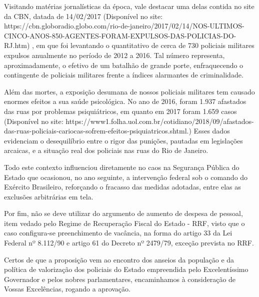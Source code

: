 \documentclass[10pt]{article}
\begin{document}
Visitando matérias jornalísticas da época, vale destacar uma delas contida no site da CBN, datada de 14/02/2017 (Disponível no site: https://cbn.globoradio.globo.com/rio-de-janeiro/2017/02/14/NOS-ULTIMOS-CINCO-ANOS-850-AGENTES-FORAM-EXPULSOS-DAS-POLICIAS-DO-RJ.htm) , em que foi levantando o quantitativo de cerca de 730 policiais militares expulsos anualmente no período de 2012 a 2016. Tal número representa, aproximadamente, o efetivo de um batalhão de grande porte, enfraquecendo o contingente de policiais militares frente a índices alarmantes de criminalidade.

Além das mortes, a exposição desumana de nossos policiais militares tem causado enormes efeitos a sua saúde psicológica. No ano de 2016, foram 1.937 afastados das ruas por problemas psiquiátricos, em quanto em 2017 foram 1.659 casos (Disponível no site: https://www1.folha.uol.com.br/cotidiano/2018/09/afastados-das-ruas-policiais-cariocas-sofrem-efeitos-psiquiatricos.shtml.) Esses dados evidenciam o desequilíbrio entre o rigor das punições, pautadas em legislações arcaicas, e a situação real dos policiais nas ruas do Rio de Janeiro. 

Todo este contexto influenciou diretamente no caos na Segurança Pública do Estado que ocasionou, no ano seguinte, a intervenção federal sob o comando do Exército Brasileiro, reforçando o fracasso das medidas adotadas, entre elas as exclusões arbitrárias em tela.

Por fim, não se deve utilizar do argumento de aumento de despesa de pessoal, item vedado pelo Regime de Recuperação Fiscal do Estado - RRF, visto que o caso configura-se preenchimento de vacância, na forma do artigo 33 da Lei Federal nº 8.112/90 e artigo 61 do Decreto nº 2479/79, exceção prevista no RRF.

Certos de que a proposição vem ao encontro dos anseios da população e da política de valorização dos policiais do Estado empreendida pelo Excelentíssimo Governador e pelos  nobres parlamentares, encaminhamos à consideração de Vossas Excelências, rogando a aprovação.




\iffalse
\begin{center}
  \textbf{REFERÊNCIAS}
\end{center}


\fi
\end{document}
